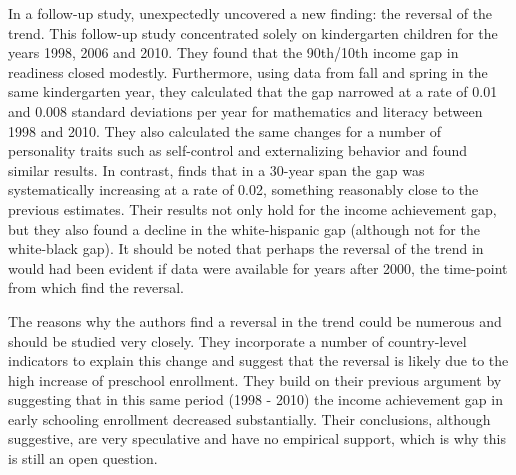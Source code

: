 \documentclass[11pt, a4paper]{article}\usepackage[]{graphicx}\usepackage[]{color}
\begin{document}
In a follow-up study, \citet{reardon_portilla} unexpectedly uncovered a new finding: the reversal of the trend. This follow-up study concentrated solely on kindergarten children for the years 1998, 2006 and 2010. They found that the 90th/10th income gap in readiness closed modestly. Furthermore, using data from fall and spring in the same kindergarten year, they calculated that the gap narrowed at a rate of 0.01 and 0.008 standard deviations per year for mathematics and literacy between 1998 and 2010. They also calculated the same changes for a number of personality traits such as self-control and externalizing behavior and found similar results. In contrast, \citet{reardon2011} finds that in a 30-year span the gap was systematically increasing at a rate of 0.02, something reasonably close to the previous estimates. Their results not only hold for the income achievement gap, but they also found a decline in the white-hispanic gap (although not for the white-black gap). It should be noted that perhaps the reversal of the trend in \citet{reardon2011} would had been evident if data were available for years after 2000, the time-point from which \citet{reardon_portilla} find the reversal.

The reasons why the authors find a reversal in the trend could be numerous and should be studied very closely. They incorporate a number of country-level indicators to explain this change and suggest that the reversal is likely due to the high increase of preschool enrollment. They build on their previous argument by suggesting that in this same period (1998 - 2010) the income achievement gap in early schooling enrollment decreased substantially. Their conclusions, although suggestive, are very speculative and have no empirical support, which is why this is still an open question.
\end{document}
